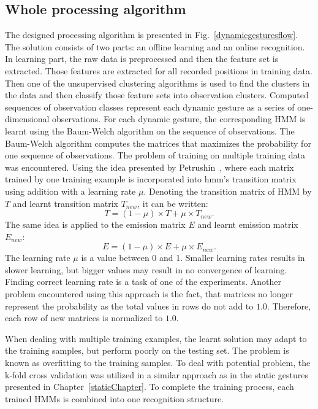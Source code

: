 \subsection{Whole processing algorithm}
The designed processing algorithm is presented in Fig.~\ref{dynamicgesturesflow}.
The solution consists of two parts: an offline learning and an online recognition.
In learning part, the raw data is preprocessed and then the feature set is extracted. 
Those features are extracted for all recorded positions in training data.
Then one of the unsupervised clustering algorithms is used to find the clusters in the data and then classify those feature sets into observation clusters.
Computed sequences of observation classes represent each dynamic gesture as a series of one-dimensional observations.
For each dynamic gesture, the corresponding HMM is learnt using the Baum-Welch algorithm on the sequence of observations.
The Baum-Welch algorithm computes the matrices that maximizes the probability for one sequence of observations. The problem of training on multiple training data was encountered.
Using the idea presented by Petrushin~\cite{hmmtutorial}, where each matrix trained by one training example is incorporated into hmm's transition matrix using addition with a learning rate $\mu$.
Denoting the transition matrix of HMM by $T$ and learnt transition matrix $T_{new}$, it can be written:
\begin{equation}\label{eq:dynT}
T = (1-\mu) \times T + \mu \times T_{new}.
\end{equation}
The same idea is applied to the emission matrix $E$ and learnt emission matrix $E_{new}$:
\begin{equation}\label{eq:dynE}
E = (1-\mu) \times E + \mu \times E_{new}.
\end{equation}
The learning rate $\mu$ is a value between 0 and 1.
Smaller learning rates results in slower learning, but bigger values may result in no convergence of learning. 
Finding correct learning rate is a task of one of the experiments.
Another problem encountered using this approach is the fact, that matrices no longer represent the probability as the total values in rows do not add to $1.0$.
Therefore, each row of new matrices is normalized to $1.0$.

When dealing with multiple training examples, the learnt solution may adapt to the training samples, but perform poorly on the testing set. 
The problem is known as overfitting to the training samples.
To deal with potential problem, the k-fold cross validation was utilized in a similar approach as in the static gestures presented in Chapter~\ref{staticChapter}.
To complete the training process, each trained HMMs is combined into one recognition structure.


